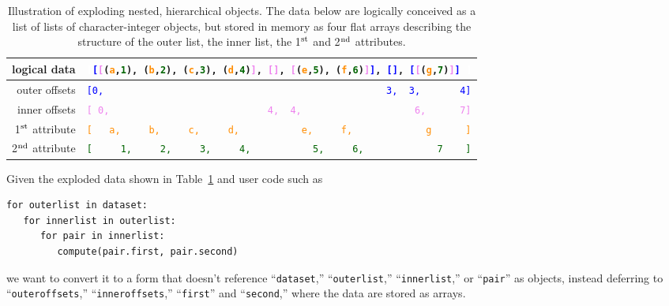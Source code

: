 \documentclass[a4paper]{jpconf}
\begin{document}
\begin{table}
\caption{\label{tab:exploding} Illustration of exploding nested, hierarchical objects. The data below are logically conceived as a list of lists of character-integer objects, but stored in memory as four flat arrays describing the structure of the outer list, the inner list, the 1$^{\mbox{\scriptsize st}}$ and 2$^{\mbox{\scriptsize nd}}$ attributes.}

\begin{center}
\begin{tabular}{r l}
logical data & {\tt\small \textcolor{white}{[}\textcolor{blue}{[}\textcolor{violet}{[}(\textcolor{darkorange}{a},\textcolor{darkgreen}{1}), (\textcolor{darkorange}{b},\textcolor{darkgreen}{2}), (\textcolor{darkorange}{c},\textcolor{darkgreen}{3}), (\textcolor{darkorange}{d},\textcolor{darkgreen}{4})\textcolor{violet}{]}, \textcolor{violet}{[]}, \textcolor{violet}{[}(\textcolor{darkorange}{e},\textcolor{darkgreen}{5}), (\textcolor{darkorange}{f},\textcolor{darkgreen}{6})\textcolor{violet}{]}\textcolor{blue}{]}, \textcolor{blue}{[]}, \textcolor{blue}{[}\textcolor{violet}{[}(\textcolor{darkorange}{g},\textcolor{darkgreen}{7})\textcolor{violet}{]}\textcolor{blue}{]}\ \textcolor{white}{]}} \\\hline
outer offsets & {\tt\small \textcolor{blue}{[0,\ \ \ \ \ \ \ \ \ \ \ \ \ \ \ \ \ \ \ \ \ \ \ \ \ \ \ \ \ \ \ \ \ \ \ \ \ \ \ \ \ \ \ \ \ \ \ \ \ \ 3,\ \ 3,\ \ \ \ \ \ \ 4]}} \\
inner offsets & {\tt\small \textcolor{violet}{[\ 0,\ \ \ \ \ \ \ \ \ \ \ \ \ \ \ \ \ \ \ \ \ \ \ \ \ \ \ \ 4,\ \ 4,\ \ \ \ \ \ \ \ \ \ \ \ \ \ \ \ \ \ \ \ 6,\ \ \ \ \ \ 7]}} \\
1$^{\mbox{\scriptsize st}}$ attribute & {\tt\small \textcolor{darkorange}{[\ \ \ a,\ \ \ \ \ b,\ \ \ \ \ c,\ \ \ \ \ d,\ \ \ \ \ \ \ \ \ \ \ e,\ \ \ \ \ f,\ \ \ \ \ \ \ \ \ \ \ \ \ g\ \ \ \ \ \ ]}} \\
2$^{\mbox{\scriptsize nd}}$ attribute & {\tt\small \textcolor{darkgreen}{[\ \ \ \ \ 1,\ \ \ \ \ 2,\ \ \ \ \ 3,\ \ \ \ \ 4,\ \ \ \ \ \ \ \ \ \ \ 5,\ \ \ \ \ 6,\ \ \ \ \ \ \ \ \ \ \ \ \ 7\ \ \ \ ]}}
\end{tabular}
\end{center}
\vspace{-0.5 cm}
\end{table}

Given the exploded data shown in Table~\ref{tab:exploding} and user code such as
\begin{center}
\begin{minipage}{0.7\linewidth}
\begin{verbatim}
for outerlist in dataset:
   for innerlist in outerlist:
      for pair in innerlist:
         compute(pair.first, pair.second)
\end{verbatim}
\end{minipage}
\end{center}
we want to convert it to a form that doesn't reference ``{\tt dataset},'' ``{\tt outerlist},'' ``{\tt innerlist},'' or ``{\tt pair}'' as objects, instead deferring to ``{\tt outeroffsets},'' ``{\tt inneroffsets},'' ``{\tt first}'' and ``{\tt second},'' where the data are stored as arrays.
\end{document}
